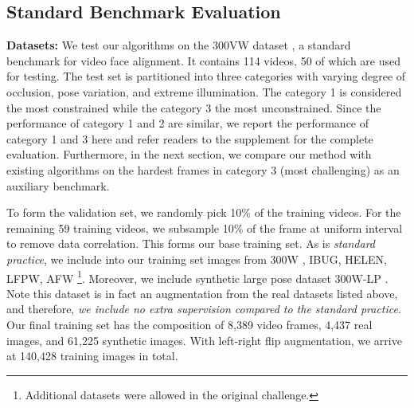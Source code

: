 \documentclass[letterpaper]{article} %
\begin{document}
\subsection{Standard Benchmark Evaluation}

{\bf Datasets:}
We test our algorithms on the 300VW dataset \cite{shen2015first}, a standard benchmark for video face alignment. It contains 114 videos, 50 of which are used for testing. The test set is partitioned into three categories with varying degree of occlusion, pose variation, and extreme illumination. The category 1 is considered the most constrained while the category 3 the most unconstrained. Since the performance of category 1 and 2 are similar, we report the performance of category 1 and 3 here and refer readers to the supplement for the complete evaluation. Furthermore, in the next section, we compare our method with existing algorithms on the hardest frames in category 3 (most challenging) as an auxiliary benchmark.

To form the validation set, we randomly pick 10\% of the training videos. For the remaining 59 training videos, we subsample 10\% of the frame at uniform interval to remove data correlation. This forms our base training set. As is {\em standard practice}, we include into our training set images from 300W \cite{Sagonas2013300FI}, IBUG, HELEN, LFPW, AFW \footnote{Additional datasets were allowed in the original challenge.}. Moreover, we include synthetic large pose dataset 300W-LP \cite{Zhu2016FaceAA}. Note this dataset is in fact an augmentation from the real datasets listed above, and therefore, {\em we include no extra supervision compared to the standard practice}. Our final training set has the composition of 8,389 video frames, 4,437 real images, and 61,225 synthetic images. With left-right flip augmentation, we arrive at 140,428 training images in total.

\newcommand{\fst}{\cellcolor{cfirst}}
\newcommand{\snd}{\cellcolor{csecond}}
\newcommand{\trd}{\cellcolor{cthird}}
\end{document}
